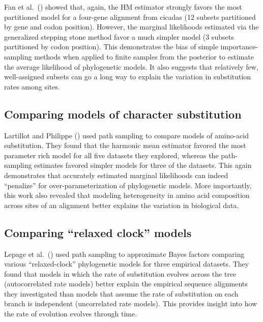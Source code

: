 Fan et al.\ (\citeyear{Fan2011}) showed that, again, the HM estimator strongly
favors the most partitioned model for a four-gene alignment from cicadas (12
subsets partitioned by gene and codon position).
However, the marginal likelihoods estimated via the generalized stepping stone
method favor a much simpler model (3 subsets partitioned by codon position).
This demonstrates the bias of simple importance-sampling methods when applied
to finite samples from the posterior to estimate the average likelihood of
phylogenetic models.
It also suggests that relatively few, well-assigned subsets can go a long way
to explain the variation in substitution rates among sites.

\subsection{Comparing models of character substitution}

Lartillot and Philippe (\citeyear{Lartillot2006}) used path sampling to compare
models of amino-acid substitution.
They found that the harmonic mean estimator favored the most parameter rich
model for all five datasets they explored, whereas the path-sampling estimates
favored simpler models for three of the datasets.
This again demonstrates that accurately estimated marginal likelihoods can
indeed ``penalize'' for over-parameterization of phylogenetic models.
More importantly, this work also revealed that modeling heterogeneity in amino
acid composition across sites of an alignment better explains the variation in
biological data.

\subsection{Comparing ``relaxed clock'' models}

Lepage et al.\ (\citeyear{Lepage2007}) used path sampling to approximate Bayes
factors comparing various ``relaxed-clock'' phylogenetic models for
three empirical datasets.
They found that models in which the rate of substitution evolves across the tree
(autocorrelated rate models) better explain the empirical sequence alignments
they investigated than models that assume the rate of substitution on each
branch is independent (uncorrelated rate models).
This provides insight into how the rate of evolution evolves through time.

